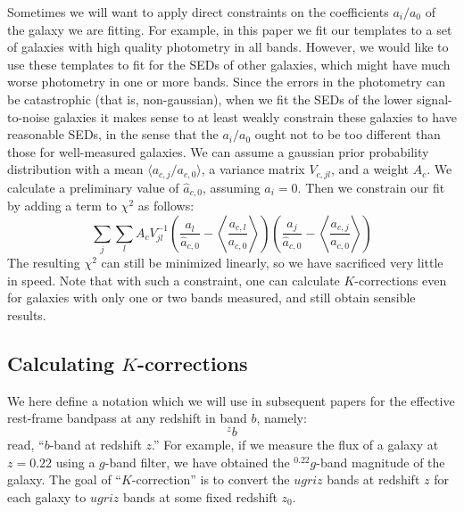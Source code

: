 \documentclass[10pt,preprint]{aastex}
\newcommand{\avg}[1]{{\langle{#1}\rangle}}
\newcommand{\Avg}[1]{{\left\langle{#1}\right\rangle}}
\newcommand{\band}[2]{\ensuremath{^{#1}\!{#2}}}
\begin{document}
Sometimes we will want to apply direct constraints on the coefficients
$a_i/a_0$ of the galaxy we are fitting. For example, in this paper we
fit our templates to a set of galaxies with high quality photometry in
all bands. However, we would like to use these templates to fit for
the SEDs of other galaxies, which might have much worse photometry in
one or more bands. Since the errors in the photometry can be
catastrophic (that is, non-gaussian), when we fit the SEDs of the
lower signal-to-noise galaxies it makes sense to at least weakly
constrain these galaxies to have reasonable SEDs, in the sense that
the $a_i/a_0$ ought not to be too different than those for
well-measured galaxies. We can assume a gaussian prior probability
distribution with a mean $\avg{a_{c,j}/a_{c,0}}$, a variance matrix
$V_{c,jl}$, and a weight $A_c$.  We calculate a preliminary value of
${\hat{a}}_{c,0}$, assuming $a_i = 0$. Then we constrain our fit by
adding a term to $\chi^2$ as follows:
\begin{equation}
\sum_j \sum_l A_c V^{-1}_{jl}
\left(\frac{a_l}{{\hat{a}}_{c,0}}-\Avg{\frac{a_{c,l}}{a_{c,0}}}\right)
\left(\frac{a_j}{{\hat{a}}_{c,0}}-\Avg{\frac{a_{c,j}}{a_{c,0}}}\right)
\end{equation}
The resulting $\chi^2$ can still be minimized linearly, so we have
sacrificed very little in speed.  Note that with such a constraint,
one can calculate $K$-corrections even for galaxies with only one or
two bands measured, and still obtain sensible results. 

\subsection{Calculating $K$-corrections}

We here define a notation which we will use in subsequent papers for
the effective rest-frame bandpass at any redshift in band $b$, namely:
\begin{equation}
\band{z}{b}
\end{equation}
read, ``$b$-band at redshift $z$.'' For example, if we measure the
flux of a galaxy at $z=0.22$ using a $g$-band filter, we have obtained
the $\band{0.22}{g}$-band magnitude of the galaxy. The goal of
``$K$-correction'' is to convert the $ugriz$ bands at redshift $z$
for each galaxy to $ugriz$ bands at some fixed redshift $z_0$.
\end{document}
